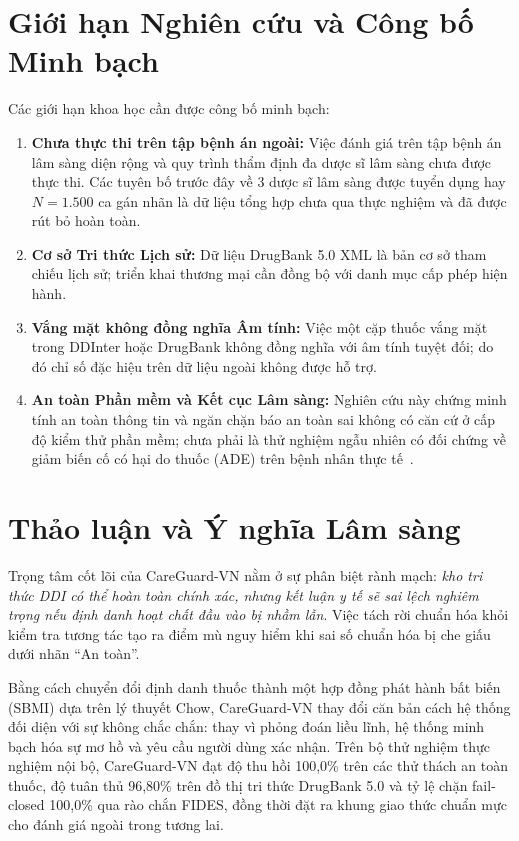 \documentclass[11pt]{article}
\begin{document}
\section{Giới hạn Nghiên cứu và Công bố Minh bạch}
Các giới hạn khoa học cần được công bố minh bạch:
\begin{enumerate}
  \item \textbf{Chưa thực thi trên tập bệnh án ngoài:} Việc đánh giá trên tập bệnh án lâm sàng diện rộng và quy trình thẩm định đa dược sĩ lâm sàng chưa được thực thi. Các tuyên bố trước đây về 3 dược sĩ lâm sàng được tuyển dụng hay $N=1.500$ ca gán nhãn là dữ liệu tổng hợp chưa qua thực nghiệm và đã được rút bỏ hoàn toàn.
  \item \textbf{Cơ sở Tri thức Lịch sử:} Dữ liệu DrugBank 5.0 XML là bản cơ sở tham chiếu lịch sử; triển khai thương mại cần đồng bộ với danh mục cấp phép hiện hành.
  \item \textbf{Vắng mặt không đồng nghĩa Âm tính:} Việc một cặp thuốc vắng mặt trong DDInter hoặc DrugBank không đồng nghĩa với âm tính tuyệt đối; do đó chỉ số đặc hiệu trên dữ liệu ngoài không được hỗ trợ.
  \item \textbf{An toàn Phần mềm và Kết cục Lâm sàng:} Nghiên cứu này chứng minh tính an toàn thông tin và ngăn chặn báo an toàn sai không có căn cứ ở cấp độ kiểm thử phần mềm; chưa phải là thử nghiệm ngẫu nhiên có đối chứng về giảm biến cố có hại do thuốc (ADE) trên bệnh nhân thực tế~\cite{holbrook2025alerts}.
\end{enumerate}

\section{Thảo luận và Ý nghĩa Lâm sàng}
Trọng tâm cốt lõi của CareGuard-VN nằm ở sự phân biệt rành mạch: \emph{kho tri thức DDI có thể hoàn toàn chính xác, nhưng kết luận y tế sẽ sai lệch nghiêm trọng nếu định danh hoạt chất đầu vào bị nhầm lẫn}. Việc tách rời chuẩn hóa khỏi kiểm tra tương tác tạo ra điểm mù nguy hiểm khi sai số chuẩn hóa bị che giấu dưới nhãn ``An toàn''.

Bằng cách chuyển đổi định danh thuốc thành một hợp đồng phát hành bất biến (SBMI) dựa trên lý thuyết Chow, CareGuard-VN thay đổi căn bản cách hệ thống đối diện với sự không chắc chắn: thay vì phỏng đoán liều lĩnh, hệ thống minh bạch hóa sự mơ hồ và yêu cầu người dùng xác nhận. Trên bộ thử nghiệm thực nghiệm nội bộ, CareGuard-VN đạt độ thu hồi 100,0\% trên các thử thách an toàn thuốc, độ tuân thủ 96,80\% trên đồ thị tri thức DrugBank 5.0 và tỷ lệ chặn fail-closed 100,0\% qua rào chắn FIDES, đồng thời đặt ra khung giao thức chuẩn mực cho đánh giá ngoài trong tương lai.
\end{document}
